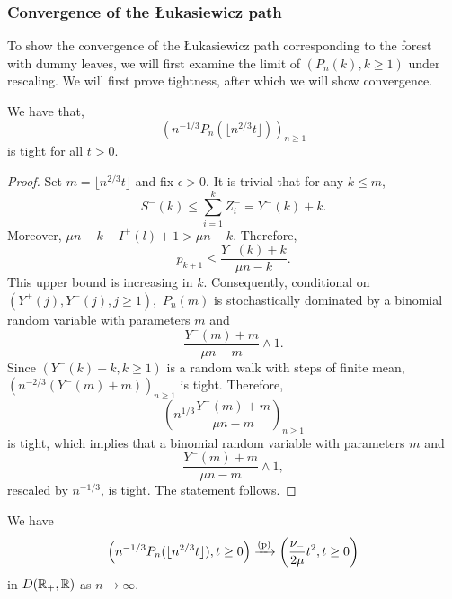 \subsubsection{Convergence of the \L ukasiewicz path}
To show the convergence of the \L ukasiewicz path corresponding to the forest with dummy leaves, we will first examine the limit of $(P_n(k), k\geq 1)$ under rescaling. We will first prove tightness, after which we will show convergence.


\begin{lemma}\label{lemma.tightnesssurplusedges}
 We have that, $$\left(n^{-1/3}P_n\left(\lfloor  n^{2/3}t\rfloor \right) \right)_{n\geq 1}$$ 
 is tight for all $t>0$.
 \end{lemma}
 \begin{proof}
Set $m=\lfloor  n^{2/3}t\rfloor$ and fix $\epsilon>0$. It is trivial that for any $k\leq m$, $$S^{-}(k)\leq \sum_{i=1}^k Z^-_i=Y^-(k)+k.$$ Moreover, $\mu n - k -I^{+}(l)+1>\mu n-k$.  Therefore, $$p_{k+1}\leq \frac{Y^-(k)+k}{\mu n - k}.$$
This upper bound is increasing in $k$. Consequently, conditional on $(Y^+(j),Y^-(j),j\geq 1),$ $P_n(m)$ is stochastically dominated by a binomial random variable with parameters  $m$ and $$\frac{Y^-(m)+m}{\mu n - m}\wedge 1.$$
Since $(Y^-(k)+k,k\geq 1)$ is a random walk with steps of finite mean, $\left(n^{-2/3}(Y^-(m)+m)\right)_{n\geq 1}$ is tight. Therefore,
$$\left(n^{1/3} \frac{Y^-(m)+m}{\mu n - m}\right)_{n\geq 1}$$ is tight, which implies that a binomial random variable with parameters  $m$ and $$\frac{Y^-(m)+m}{\mu n - m}\wedge 1,$$
rescaled by $n^{-1/3}$,
is tight. The statement follows.
\end{proof}
\begin{lemma}\label{lemma.convergenceQandP}
We have  
$$\left(n^{-1/3}P_n(\lfloor n^{2/3}t\rfloor), t \geq 0 \right)\xrightarrow[]{\mathrm{(p)}} \left(\frac{\nu_-}{2\mu} t^2, t\geq 0 \right)$$
in $D({\mathbb R}_+,{\mathbb R})$ as $n\to \infty$.

\end{lemma}
